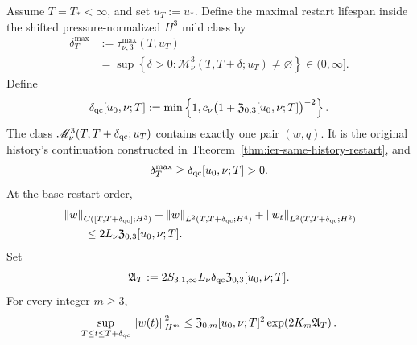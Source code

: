 \begin{theorem}
\label{thm:qc-restart}
Assume \(T=T_*<\infty\), and set \(u_T:=u_*\).
Define the maximal restart lifespan inside the shifted pressure-normalized
\(H^3\) mild class by
\begin{equation}
 \begin{aligned}
 \delta_T^{\max}
 &:=\tau_{\nu,3}^{\max}(T,u_T)\\
 &=\sup\left\{\delta>0:
 \mathscr M_\nu^3(T,T+\delta;u_T)\ne\varnothing\right\}
 \in(0,\infty].
 \end{aligned}
 \label{eq:qc-maximal-restart-lifespan-definition}
\end{equation}
Define
\begin{equation}
 \delta_{\rm qc}[u_0,\nu;T]
 :=\min\left\{
 1,
 c_\nu\bigl(1+\mathfrak Z_{0,3}[u_0,\nu;T]\bigr)^{-2}
 \right\}.
 \label{eq:qc-restart-lifespan}
\end{equation}
The class \(\mathscr M_\nu^3(T,T+\delta_{\rm qc};u_T)\) contains exactly one
pair \((w,q)\).  It is the original history's continuation constructed in
Theorem~\ref{thm:ier-same-history-restart}, and
\begin{equation}
 \delta_T^{\max}\ge\delta_{\rm qc}[u_0,\nu;T]>0.
 \label{eq:qc-restart-lower-bound}
\end{equation}
At the base restart order,
\begin{align}
 &\left\lVert w\right\rVert_{C([T,T+\delta_{\rm qc}];H^3)}
 +\left\lVert w\right\rVert_{L^2(T,T+\delta_{\rm qc};H^4)}
 +\left\lVert w_t\right\rVert_{L^2(T,T+\delta_{\rm qc};H^2)}
 \notag\\
 &\qquad\le2L_\nu\mathfrak Z_{0,3}[u_0,\nu;T].
 \label{eq:qc-restart-base-size}
\end{align}
Set
\begin{equation}
 \mathfrak A_T
 :=2S_{3,1,\infty}L_\nu\delta_{\rm qc}
 \mathfrak Z_{0,3}[u_0,\nu;T].
 \label{eq:qc-restart-action}
\end{equation}
For every integer \(m\ge3\),
\begin{equation}
 \sup_{T\le t\le T+\delta_{\rm qc}}\left\lVert w(t)\right\rVert_{H^m}^2
 \le\mathfrak Z_{0,m}[u_0,\nu;T]^2
 \exp\!\left(2K_m\mathfrak A_T\right).
 \label{eq:qc-restart-persistence-size}
\end{equation}
\end{theorem}

